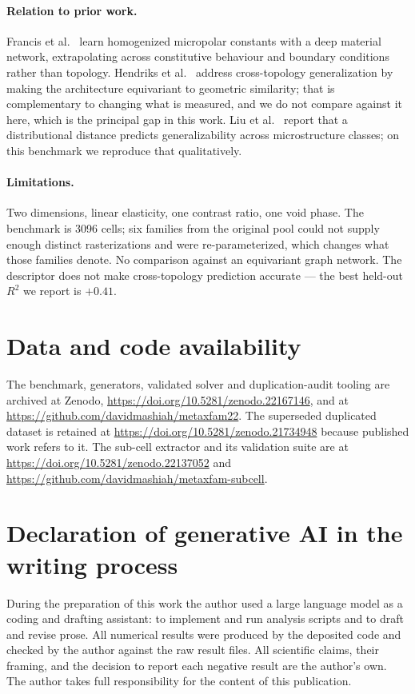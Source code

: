 \documentclass[11pt,a4paper]{article}
\newcommand{\Rtwo}{R^{2}}
\begin{document}
\paragraph{Relation to prior work.} Francis et al.\ \citep{francis2025} learn homogenized
micropolar constants with a deep material network, extrapolating across constitutive
behaviour and boundary conditions rather than topology. Hendriks et al.\
\citep{hendriks2025} address cross-topology generalization by making the architecture
equivariant to geometric similarity; that is complementary to changing what is measured, and
we do not compare against it here, which is the principal gap in this work. Liu et al.\
\citep{liu2026} report that a distributional distance predicts generalizability across
microstructure classes; on this benchmark we reproduce that qualitatively.

\paragraph{Limitations.} Two dimensions, linear elasticity, one contrast ratio, one void
phase. The benchmark is 3096 cells; six families from the original pool could not supply
enough distinct rasterizations and were re-parameterized, which changes what those families
denote. No comparison against an equivariant graph network. The descriptor does not make
cross-topology prediction accurate --- the best held-out $\Rtwo$ we report is $+0.41$.

\section*{Data and code availability}

The benchmark, generators, validated solver and duplication-audit tooling are archived at
Zenodo, \url{https://doi.org/10.5281/zenodo.22167146}, and at
\url{https://github.com/davidmashiah/metaxfam22}. The superseded duplicated dataset is
retained at \url{https://doi.org/10.5281/zenodo.21734948} because published work refers to
it. The sub-cell extractor and its validation suite are at
\url{https://doi.org/10.5281/zenodo.22137052} and
\url{https://github.com/davidmashiah/metaxfam-subcell}.

\section*{Declaration of generative AI in the writing process}

During the preparation of this work the author used a large language model as a coding and
drafting assistant: to implement and run analysis scripts and to draft and revise prose.
All numerical results were produced by the deposited code and checked by the author against
the raw result files. All scientific claims, their framing, and the decision to report each
negative result are the author's own. The author takes full responsibility for the content
of this publication.
\end{document}
